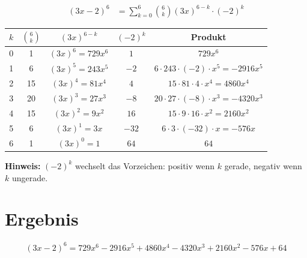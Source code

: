 \documentclass[12pt, a4paper]{article}
\begin{document}
\begin{align*}
    (3x - 2)^6 &= \sum_{k=0}^{6} \binom{6}{k} (3x)^{6-k} \cdot (-2)^k
\end{align*}

\begin{tabular}{c|c|c|c|c}
    $k$ & $\binom{6}{k}$ & $(3x)^{6-k}$ & $(-2)^k$ & Produkt \\
    \hline
    0 & 1 & $(3x)^6 = 729x^6$ & $1$ & $729x^6$ \\
    1 & 6 & $(3x)^5 = 243x^5$ & $-2$ & $6 \cdot 243 \cdot (-2) \cdot x^5 = -2916x^5$ \\
    2 & 15 & $(3x)^4 = 81x^4$ & $4$ & $15 \cdot 81 \cdot 4 \cdot x^4 = 4860x^4$ \\
    3 & 20 & $(3x)^3 = 27x^3$ & $-8$ & $20 \cdot 27 \cdot (-8) \cdot x^3 = -4320x^3$ \\
    4 & 15 & $(3x)^2 = 9x^2$ & $16$ & $15 \cdot 9 \cdot 16 \cdot x^2 = 2160x^2$ \\
    5 & 6 & $(3x)^1 = 3x$ & $-32$ & $6 \cdot 3 \cdot (-32) \cdot x = -576x$ \\
    6 & 1 & $(3x)^0 = 1$ & $64$ & $64$
\end{tabular}

\textbf{Hinweis:} $(-2)^k$ wechselt das Vorzeichen: positiv wenn $k$ gerade, negativ wenn $k$ ungerade.

\section*{Ergebnis}

\[
    \boxed{(3x-2)^6 = 729x^6 - 2916x^5 + 4860x^4 - 4320x^3 + 2160x^2 - 576x + 64}
\]
\end{document}
